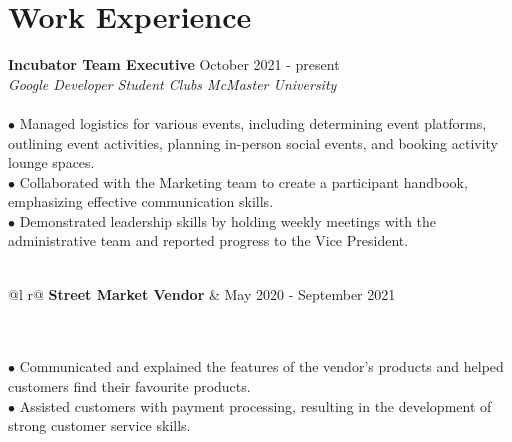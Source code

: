 \documentclass[letterpaper,12pt]{article}
\begin{document}
\section{Work Experience}
\textbf{Incubator Team Executive}  \hfill   October 2021 - present \\
\textit{Google Developer Student Clubs McMaster University}
\\\\\hspace{0.1cm} $\bullet$ Managed logistics for various events, including determining event platforms, outlining event activities, planning in-person social events, and booking activity lounge spaces. \\ 
\hspace{0.1cm} $\bullet$ \hspace{0.05cm}Collaborated with the Marketing team to create a participant handbook, emphasizing effective communication skills.\\
\hspace{0.1cm} $\bullet$ \hspace{0.03cm}Demonstrated leadership skills by holding weekly meetings with the administrative team and reported progress to the Vice President.\\\\
\begin{tabularx}{\linewidth}{ @{}l r@{} }
\textbf{Street Market Vendor} &  \hfill \normalsize{May 2020 - September 2021} \\
\end{tabularx} \\\\
\hspace{0.1cm} $\bullet$ Communicated and explained the features of the vendor's products and helped customers find their favourite products.\\
\hspace{0.1cm} $\bullet$ \hspace{0.05cm}Assisted customers with payment processing, resulting in the development of strong customer service skills.
\end{document}
